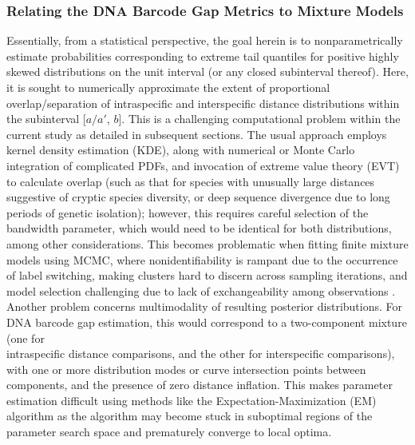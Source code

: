 \documentclass[12pt]{article}
\begin{document}
\subsubsection{Relating the DNA Barcode Gap Metrics to Mixture Models}

Essentially, from a statistical perspective, the goal herein is to nonparametrically estimate probabilities corresponding to extreme tail quantiles for positive highly skewed distributions on the unit interval  (or any closed subinterval thereof). Here, it is sought to numerically approximate the extent of proportional overlap/separation of intraspecific and interspecific distance distributions within the subinterval [$a/a'$, $b$]. This is a challenging computational problem within the current study as detailed in subsequent sections. The usual approach employs kernel density estimation (KDE), along with numerical or Monte Carlo integration of complicated PDFs, and invocation of extreme value theory (EVT) to calculate overlap (such as that for species with unusually large distances suggestive of cryptic species diversity, or deep sequence divergence due to long periods of genetic isolation); however, this requires careful selection of the bandwidth parameter, which would need to be identical for both distributions, among other considerations. This becomes problematic when fitting finite mixture models using MCMC, where nonidentifiability is rampant due to the occurrence of label switching, making clusters hard to discern across sampling iterations, and model selection challenging due to lack of exchangeability among observations \citep{stephens2000dealing}. Another problem concerns multimodality of resulting posterior distributions. For DNA barcode gap estimation, this would correspond to a two-component mixture (one for \\ intraspecific distance comparisons, and the other for interspecific comparisons), with one or more distribution modes or curve intersection points between components, and the presence of zero distance inflation. This makes parameter estimation difficult using methods like the Expectation-Maximization (EM) algorithm \citep{dempster1977maximum} as the algorithm may become stuck in suboptimal regions of the parameter search space and prematurely converge to local optima. 
\end{document}
